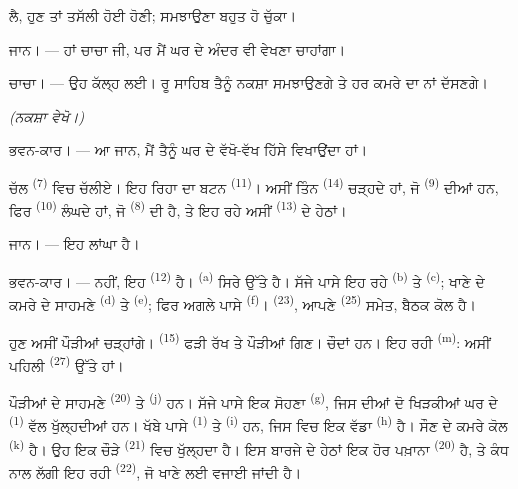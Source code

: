 ਲੈ, ਹੁਣ ਤਾਂ ਤਸੱਲੀ ਹੋਈ ਹੋਣੀ; ਸਮਝਾਉਣਾ ਬਹੁਤ ਹੋ ਚੁੱਕਾ।

\textsc{ਜਾਨ}। --- ਹਾਂ ਚਾਚਾ ਜੀ, ਪਰ ਮੈਂ ਘਰ ਦੇ ਅੰਦਰ ਵੀ ਵੇਖਣਾ ਚਾਹਾਂਗਾ।

\textsc{ਚਾਚਾ}। --- ਉਹ ਕੱਲ੍ਹ ਲਈ। ਰੂ ਸਾਹਿਬ ਤੈਨੂੰ ਨਕਸ਼ਾ ਸਮਝਾਉਣਗੇ ਤੇ ਹਰ ਕਮਰੇ ਦਾ ਨਾਂ
ਦੱਸਣਗੇ।

\VUsaut{3.0mm}
\VUsaut{2.4mm}

{\centering\textit{(ਨਕਸ਼ਾ ਵੇਖੋ।)}\par}
\VUsaut{2.4mm}

\textsc{ਭਵਨ-ਕਾਰ}। --- ਆ ਜਾਨ, ਮੈਂ ਤੈਨੂੰ ਘਰ ਦੇ ਵੱਖੋ-ਵੱਖ ਹਿੱਸੇ ਵਿਖਾਉਂਦਾ ਹਾਂ।

ਚੱਲ  \textsuperscript{(7)} ਵਿਚ ਚੱਲੀਏ। ਇਹ ਰਿਹਾ
 ਦਾ ਬਟਨ \textsuperscript{(11)}। ਅਸੀਂ ਤਿੰਨ 
\textsuperscript{(14)} ਚੜ੍ਹਦੇ ਹਾਂ, ਜੋ  \textsuperscript{(9)} ਦੀਆਂ
ਹਨ, ਫਿਰ  \textsuperscript{(10)} ਲੰਘਦੇ ਹਾਂ, ਜੋ 
\textsuperscript{(8)} ਦੀ ਹੈ, ਤੇ ਇਹ ਰਹੇ ਅਸੀਂ 
\textsuperscript{(13)} ਦੇ ਹੇਠਾਂ।

\textsc{ਜਾਨ}। --- ਇਹ ਲਾਂਘਾ ਹੈ।

\textsc{ਭਵਨ-ਕਾਰ}। --- ਨਹੀਂ, ਇਹ  \textsuperscript{(12)} ਹੈ।
 \textsuperscript{(a)} ਸਿਰੇ ਉੱਤੇ ਹੈ। ਸੱਜੇ ਪਾਸੇ ਇਹ ਰਹੇ
 \textsuperscript{(b)} ਤੇ  \textsuperscript{(c)};
ਖਾਣੇ ਦੇ ਕਮਰੇ ਦੇ ਸਾਹਮਣੇ  \textsuperscript{(d)} ਤੇ
 \textsuperscript{(e)}; ਫਿਰ ਅਗਲੇ ਪਾਸੇ
 \textsuperscript{(f)}। 
\textsuperscript{(23)}, ਆਪਣੇ  \textsuperscript{(25)} ਸਮੇਤ,
ਬੈਠਕ ਕੋਲ ਹੈ।

ਹੁਣ ਅਸੀਂ ਪੌੜੀਆਂ ਚੜ੍ਹਾਂਗੇ।  \textsuperscript{(15)} ਫੜੀ ਰੱਖ ਤੇ
ਪੌੜੀਆਂ ਗਿਣ। ਚੌਦਾਂ ਹਨ। ਇਹ ਰਹੀ  \textsuperscript{(m)}: ਅਸੀਂ ਪਹਿਲੀ
 \textsuperscript{(27)} ਉੱਤੇ ਹਾਂ।

\VUsaut{3.0mm}
\VUsaut{3.0mm}

ਪੌੜੀਆਂ ਦੇ ਸਾਹਮਣੇ  \textsuperscript{(20)} ਤੇ
 \textsuperscript{(j)} ਹਨ। ਸੱਜੇ ਪਾਸੇ ਇਕ ਸੋਹਣਾ
 \textsuperscript{(g)}, ਜਿਸ ਦੀਆਂ ਦੋ ਖਿੜਕੀਆਂ ਘਰ ਦੇ
 \textsuperscript{(1)} ਵੱਲ ਖੁੱਲ੍ਹਦੀਆਂ ਹਨ। ਖੱਬੇ ਪਾਸੇ
 \textsuperscript{(1)} ਤੇ 
\textsuperscript{(i)} ਹਨ, ਜਿਸ ਵਿਚ ਇਕ ਵੱਡਾ  \textsuperscript{(h)} ਹੈ।
ਸੌਣ ਦੇ ਕਮਰੇ ਕੋਲ  \textsuperscript{(k)} ਹੈ। ਉਹ ਇਕ ਚੌੜੇ
 \textsuperscript{(21)} ਵਿਚ ਖੁੱਲ੍ਹਦਾ ਹੈ। ਇਸ ਬਾਰਜੇ ਦੇ ਹੇਠਾਂ ਇਕ
ਹੋਰ ਪਖ਼ਾਨਾ \textsuperscript{(20)} ਹੈ, ਤੇ ਕੰਧ ਨਾਲ ਲੱਗੀ ਇਹ ਰਹੀ 
\textsuperscript{(22)}, ਜੋ ਖਾਣੇ ਲਈ ਵਜਾਈ ਜਾਂਦੀ ਹੈ।

